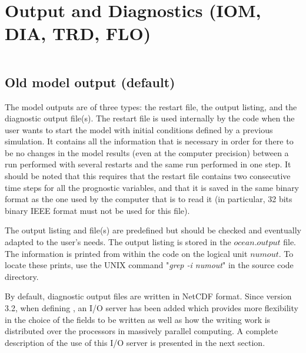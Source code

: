 \documentclass[../tex_main/NEMO_manual]{subfiles}
\begin{document}
\chapter{Output and Diagnostics (IOM, DIA, TRD, FLO)}
\label{chap:DIA}
\minitoc

\newpage
$\ $\newline    %

\section{Old model output (default)}
\label{sec:DIA_io_old}

The model outputs are of three types: the restart file, the output listing, and 
the diagnostic output file(s).
The restart file is used internally by the code when the user wants to start the model with 
initial conditions defined by a previous simulation.
It contains all the information that is necessary in order for there to be no changes in 
the model results (even at the computer precision) between a run performed with several restarts and 
the same run performed in one step.
It should be noted that this requires that the restart file contains two consecutive time steps for 
all the prognostic variables, and that it is saved in the same binary format as the one used by 
the computer that is to read it (in particular, 32 bits binary IEEE format must not be used for this file).

The output listing and file(s) are predefined but should be checked and eventually adapted to 
the user's needs.
The output listing is stored in the $ocean.output$ file.
The information is printed from within the code on the logical unit $numout$.
To locate these prints, use the UNIX command "\textit{grep -i numout}" in the source code directory.

By default, diagnostic output files are written in NetCDF format.
Since version 3.2, when defining , an I/O server has been added which 
provides more flexibility in the choice of the fields to be written as well as 
how the writing work is distributed over the processors in massively parallel computing. 
A complete description of the use of this I/O server is presented in the next section. 
\end{document}
